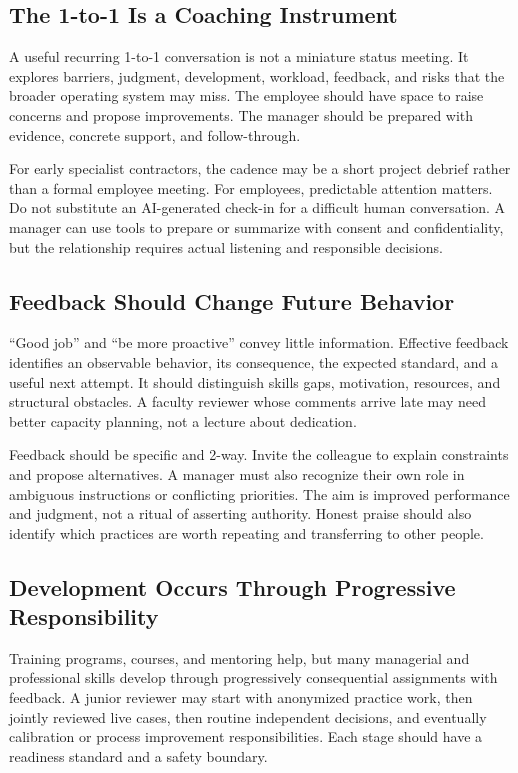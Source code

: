 \subsection{The 1-to-1 Is a Coaching Instrument}
\label{sec:one_to_one_coaching}

A useful recurring 1-to-1 conversation is not a miniature status meeting. It explores barriers, judgment, development, workload, feedback, and risks that the broader operating system may miss. The employee should have space to raise concerns and propose improvements. The manager should be prepared with evidence, concrete support, and follow-through.

For early specialist contractors, the cadence may be a short project debrief rather than a formal employee meeting. For employees, predictable attention matters. Do not substitute an AI-generated check-in for a difficult human conversation. A manager can use tools to prepare or summarize with consent and confidentiality, but the relationship requires actual listening and responsible decisions.

\subsection{Feedback Should Change Future Behavior}
\label{sec:feedback_change_future_behavior}

``Good job'' and ``be more proactive'' convey little information. Effective feedback identifies an observable behavior, its consequence, the expected standard, and a useful next attempt. It should distinguish skills gaps, motivation, resources, and structural obstacles. A faculty reviewer whose comments arrive late may need better capacity planning, not a lecture about dedication.

Feedback should be specific and 2-way. Invite the colleague to explain constraints and propose alternatives. A manager must also recognize their own role in ambiguous instructions or conflicting priorities. The aim is improved performance and judgment, not a ritual of asserting authority. Honest praise should also identify which practices are worth repeating and transferring to other people.

\subsection{Development Occurs Through Progressive Responsibility}
\label{sec:progressive_responsibility}

Training programs, courses, and mentoring help, but many managerial and professional skills develop through progressively consequential assignments with feedback. A junior reviewer may start with anonymized practice work, then jointly reviewed live cases, then routine independent decisions, and eventually calibration or process improvement responsibilities. Each stage should have a readiness standard and a safety boundary.

